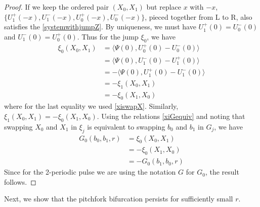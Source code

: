 \documentclass[thesis.tex]{subfiles}
\begin{document}
\begin{lemma}
\begin{proof}
If we keep the ordered pair $(X_0, X_1)$ but replace $x$ with $-x$, $\{ U_1^+(-x), U_1^-(-x), U_0^+(-x), U_0^-(-x)\}$, pieced together from L to R, also satisfies the \eqref{systemwithjumpZ}. By uniqueness, we must have $U_1^+(0) = U_0^-(0)$ and $U_1^-(0) = U_0^+(0)$. Thus for the jump $\xi_0$, we have
\begin{align*}
\xi_0(X_0, X_1) &= \langle \Psi(0), U_0^+(0) - U_0^-(0) \rangle \\
&= \langle \Psi(0), U_1^-(0) - U_1^+(0) \rangle \\
&= -\langle \Psi(0), U_1^+(0) - U_1^-(0) \rangle \\
&= -\xi_1(X_0, X_1) \\
&= -\xi_0(X_1, X_0)
\end{align*}
where for the last equality we used \eqref{xiswapX}. Similarly, $\xi_1(X_0, X_1) = -\xi_0(X_1, X_0)$. Using the relations \eqref{xiGequiv} and noting that swapping $X_0$ and $X_1$ in $\xi_j$ is equivalent to swapping $b_0$ and $b_1$ in $G_j$, we have
\begin{align*}
G_0(b_0, b_1, r) &= \xi_0(X_0, X_1) \\
&= -\xi_0(X_1, X_0) \\
&= -G_0(b_1, b_0, r)
\end{align*}
Since for the 2-periodic pulse we are using the notation $G$ for $G_0$, the result follows.
\end{proof}
\end{lemma}

Next, we show that the pitchfork bifurcation persists for sufficiently small $r$.
\end{document}
